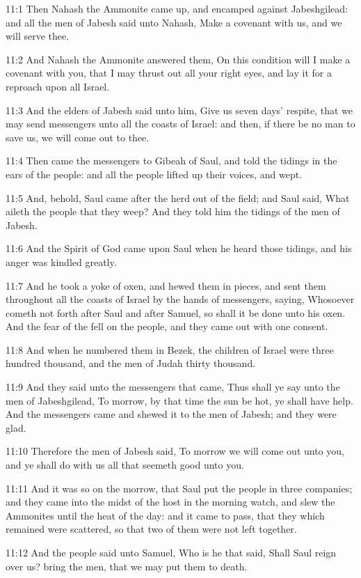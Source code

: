 11:1 Then Nahash the Ammonite came up, and encamped against
Jabeshgilead: and all the men of Jabesh said unto Nahash, Make a
covenant with us, and we will serve thee.

11:2 And Nahash the Ammonite answered them, On this condition will I
make a covenant with you, that I may thrust out all your right eyes,
and lay it for a reproach upon all Israel.

11:3 And the elders of Jabesh said unto him, Give us seven days'
respite, that we may send messengers unto all the coasts of Israel:
and then, if there be no man to save us, we will come out to thee.

11:4 Then came the messengers to Gibeah of Saul, and told the tidings
in the ears of the people: and all the people lifted up their voices,
and wept.

11:5 And, behold, Saul came after the herd out of the field; and Saul
said, What aileth the people that they weep? And they told him the
tidings of the men of Jabesh.

11:6 And the Spirit of God came upon Saul when he heard those tidings,
and his anger was kindled greatly.

11:7 And he took a yoke of oxen, and hewed them in pieces, and sent
them throughout all the coasts of Israel by the hands of messengers,
saying, Whosoever cometh not forth after Saul and after Samuel, so
shall it be done unto his oxen. And the fear of the \LORD fell on the
people, and they came out with one consent.

11:8 And when he numbered them in Bezek, the children of Israel were
three hundred thousand, and the men of Judah thirty thousand.

11:9 And they said unto the messengers that came, Thus shall ye say
unto the men of Jabeshgilead, To morrow, by that time the sun be hot,
ye shall have help. And the messengers came and shewed it to the men
of Jabesh; and they were glad.

11:10 Therefore the men of Jabesh said, To morrow we will come out
unto you, and ye shall do with us all that seemeth good unto you.

11:11 And it was so on the morrow, that Saul put the people in three
companies; and they came into the midst of the host in the morning
watch, and slew the Ammonites until the heat of the day: and it came
to pass, that they which remained were scattered, so that two of them
were not left together.

11:12 And the people said unto Samuel, Who is he that said, Shall Saul
reign over us? bring the men, that we may put them to death.

